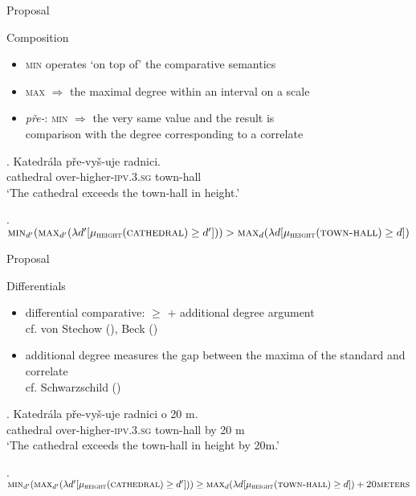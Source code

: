 \documentclass[12pt]{beamer}
\begin{document}
\begin{frame}{Proposal}

Composition

\begin{itemize}
\item \textsc{min} operates `on top of' the comparative semantics
\item \textsc{max} $\Rightarrow$ the maximal degree within an interval on a scale
\item \textit{pře-}: \textsc{min} $\Rightarrow$ the very same value and the result is \\
comparison with the degree corresponding to a correlate
\end{itemize}

\exg. Katedrála pře-vyš-uje radnici.\label{ex:ExVs}\\
cathedral over-higher-\textsc{ipv.3.sg} town-hall\\
`The cathedral exceeds the town-hall in height.'

\ex. $\textsc{min}_{d'}(\textsc{max}_{d'}(\lambda d'[\mu_{\textsc{height}}(\textsc{cathedral})\geq d']))>\textsc{max}_{d}(\lambda d[\mu_{\textsc{height}}(\textsc{town-hall})\geq d])$\label{ex:exceed-semantics} 


\end{frame}


\begin{frame}{Proposal}

Differentials

\begin{itemize}
\item differential comparative: $\geq$ + additional degree argument\\
\scriptsize cf. von Stechow (\citeyear{von_stechow1984comparing}), Beck (\citeyear{beck2011comparison})\normalsize
\item additional degree measures the gap between the maxima of the standard and correlate\\
\scriptsize cf. Schwarzschild (\citeyear{schwarzschild2008semantics})\normalsize
\end{itemize}

\exg. Katedrála pře-vyš-uje radnici o 20 m.\\
cathedral over-higher-\textsc{ipv.3.sg} town-hall by 20 m\\
`The cathedral exceeds the town-hall in height by 20m.'

\ex. $\textsc{min}_{d'}(\textsc{max}_{d'}(\lambda d'[\mu_{\textsc{height}}(\textsc{cathedral})\geq d']))\geq \textsc{max}_{d}(\lambda d[\mu_{\textsc{height}}(\textsc{town-hall})\geq d]) + \textsc{20meters}$\label{ex:exceed-differential-semantics} 


\end{frame}
\end{document}
